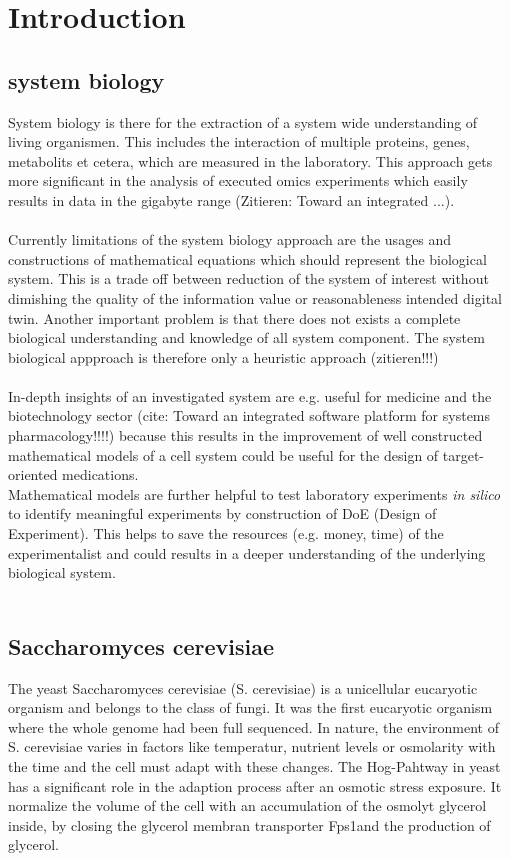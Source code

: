 \section{Introduction}
\subsection{system biology}
System biology is there for the extraction of a system wide understanding of living organismen. This includes the interaction of multiple proteins, genes, metabolits et cetera, which are measured in the laboratory. This approach gets more significant in the analysis of executed omics experiments which easily results in data in the gigabyte range (Zitieren: Toward an integrated ...). \\\\
Currently limitations of the system biology approach are the usages and constructions of mathematical equations which should represent the biological system. This is a trade off between reduction of the system of interest without dimishing the quality of the information value or reasonableness intended digital twin. Another important problem is that there does not exists a complete biological understanding and knowledge of all system component. The system biological appproach is therefore only a heuristic approach (zitieren!!!) \\\\
In-depth insights of an investigated system are e.g. useful for medicine and the biotechnology sector (cite: Toward an integrated software platform for systems pharmacology!!!!) because this results in the improvement of  
well constructed mathematical models of a cell system could be useful for the design of target-oriented medications. \\

Mathematical models are further helpful to test laboratory experiments \textit{in silico} to identify meaningful experiments by construction of DoE (Design of Experiment). This helps to save the resources (e.g. money, time) of the experimentalist and could results in a deeper understanding of the underlying biological system.\\\\

\subsection{Saccharomyces cerevisiae}
The yeast Saccharomyces cerevisiae (S. cerevisiae) is a unicellular eucaryotic organism and belongs to the class of fungi. It was the first eucaryotic organism where the whole genome had been full sequenced. %
In nature, the environment of S. cerevisiae varies in factors like temperatur, nutrient levels or osmolarity with the time and the cell must adapt with these changes. The Hog-Pahtway in yeast has a significant role in the adaption process after an osmotic stress exposure. It normalize the volume of the cell with an accumulation of the osmolyt glycerol inside, by closing the glycerol membran transporter Fps1and the production of glycerol.  \\

